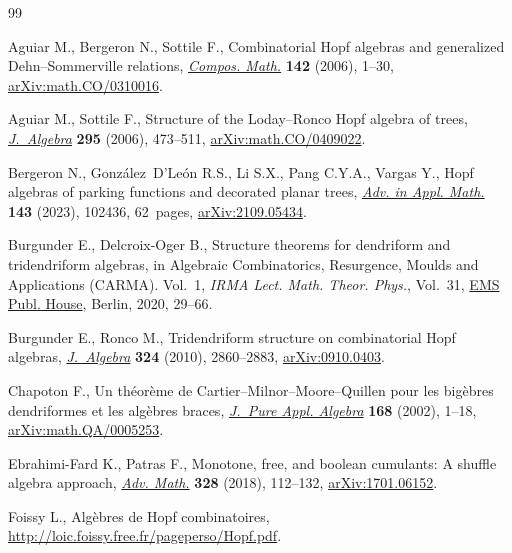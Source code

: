 \documentclass[pdftex]{sigma}
\numberwithin{equation}{section}
\theoremstyle{definition}
\theoremstyle{plain}
\begin{document}
\begin{thebibliography}{99}
\footnotesize\itemsep=0pt

Aguiar M., Bergeron N., Sottile F., Combinatorial {H}opf algebras and
 generalized {D}ehn--{S}ommerville relations, \href{https://doi.org/10.1112/S0010437X0500165X}{\textit{Compos. Math.}}
 \textbf{142} (2006), 1--30, \href{https://arxiv.org/abs/math.CO/0310016}{arXiv:math.CO/0310016}.

Aguiar M., Sottile F., Structure of the {L}oday--{R}onco {H}opf algebra of
 trees, \href{https://doi.org/10.1016/j.jalgebra.2005.06.021}{\textit{J.~Algebra}} \textbf{295} (2006), 473--511,
 \href{https://arxiv.org/abs/math.CO/0409022}{arXiv:math.CO/0409022}.

Bergeron N., Gonz\'alez~D'Le\'on R.S., Li S.X., Pang C.Y.A., Vargas Y., Hopf
 algebras of parking functions and decorated planar trees, \href{https://doi.org/10.1016/j.aam.2022.102436}{\textit{Adv. in
 Appl. Math.}} \textbf{143} (2023), 102436, 62~pages, \href{https://arxiv.org/abs/2109.05434}{arXiv:2109.05434}.

Burgunder E., Delcroix-Oger B., Structure theorems for dendriform and
 tridendriform algebras, in Algebraic {C}ombinatorics, {R}esurgence, {M}oulds
 and {A}pplications ({CARMA}). {V}ol.~1, \textit{IRMA Lect. Math. Theor.
 Phys.}, Vol.~31, \href{https://doi.org/10.4171/204-1/2}{EMS Publ. House}, Berlin, 2020, 29--66.

Burgunder E., Ronco M., Tridendriform structure on combinatorial {H}opf
 algebras, \href{https://doi.org/10.1016/j.jalgebra.2010.07.010}{\textit{J.~Algebra}} \textbf{324} (2010), 2860--2883,
 \href{https://arxiv.org/abs/0910.0403}{arXiv:0910.0403}.

Chapoton F., Un th\'eor\`eme de {C}artier--{M}ilnor--{M}oore--{Q}uillen pour
 les big\`ebres dendriformes et les alg\`ebres braces, \href{https://doi.org/10.1016/S0022-4049(01)00052-4}{\textit{J.~Pure Appl.
 Algebra}} \textbf{168} (2002), 1--18, \href{https://arxiv.org/abs/math.QA/0005253}{arXiv:math.QA/0005253}.

Ebrahimi-Fard K., Patras F., Monotone, free, and boolean cumulants: {A} shuffle
 algebra approach, \href{https://doi.org/10.1016/j.aim.2018.01.003}{\textit{Adv. Math.}} \textbf{328} (2018), 112--132,
 \href{https://arxiv.org/abs/1701.06152}{arXiv:1701.06152}.

Foissy L., Alg\`ebres de {Hopf} combinatoires,
 \url{http://loic.foissy.free.fr/pageperso/Hopf.pdf}.


\end{thebibliography}
\end{document}
